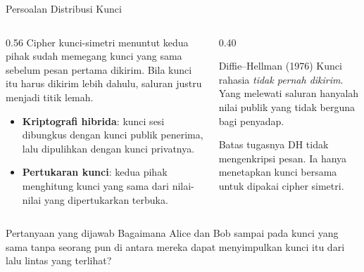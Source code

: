 \documentclass[aspectratio=169,11pt]{beamer}
\begin{document}
\begin{frame}{Persoalan Distribusi Kunci}
    \begin{columns}[T,onlytextwidth]
        \begin{column}{0.56\textwidth}
            \footnotesize
            Cipher kunci-simetri menuntut kedua pihak sudah memegang kunci
            yang sama sebelum pesan pertama dikirim. Bila kunci itu harus
            dikirim lebih dahulu, saluran justru menjadi titik lemah.
            \begin{itemize}
                \item \textbf{Kriptografi hibrida}: kunci sesi dibungkus
                      dengan kunci publik penerima, lalu dipulihkan dengan
                      kunci privatnya.
                \item \textbf{Pertukaran kunci}: kedua pihak menghitung kunci
                      yang sama dari nilai-nilai yang dipertukarkan terbuka.
            \end{itemize}
        \end{column}
        \begin{column}{0.40\textwidth}
            \begin{block}{Diffie--Hellman (1976)}
                \footnotesize
                Kunci rahasia \emph{tidak pernah dikirim}. Yang melewati
                saluran hanyalah nilai publik yang tidak berguna bagi
                penyadap.
            \end{block}
            \begin{alertblock}{Batas tugasnya}
                \footnotesize
                DH tidak mengenkripsi pesan. Ia hanya menetapkan kunci
                bersama untuk dipakai cipher simetri.
            \end{alertblock}
        \end{column}
    \end{columns}
    \vspace{0.1cm}
    \begin{exampleblock}{Pertanyaan yang dijawab}
        \footnotesize
        Bagaimana Alice dan Bob sampai pada kunci yang sama tanpa seorang
        pun di antara mereka dapat menyimpulkan kunci itu dari lalu lintas
        yang terlihat?
    \end{exampleblock}
\end{frame}
\end{document}
